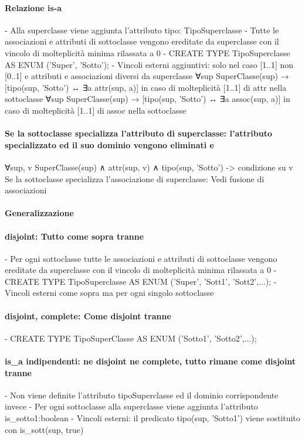 \documentclass[12pt]{article}
\begin{document}
\paragraph{Relazione is-a}
					- Alla superclasse viene aggiunta l'attributo tipo: TipoSuperclasse
					- Tutte le associazioni e attributi di sottoclasse vengono ereditate da superclasse con il vincolo di molteplicità minima rilassata a 0
					- CREATE TYPE TipoSuperclasse AS ENUM ('Super', 'Sotto');
					- Vincoli esterni aggiuntivi: solo nel caso [1..1] non [0..1] e attributi e associazioni diversi da superclasse
						∀sup SuperClasse(sup) → [tipo(sup, 'Sotto') ↔ ∃a attr(sup, a)] in caso di molteplicità [1..1] di attr nella sottoclasse
						∀sup SuperClasse(sup) → [tipo(sup, 'Sotto') ↔ ∃a assoc(sup, a)] in caso di molteplicità [1..1] di assoc nella sottoclasse
\paragraph{Se la sottoclasse specializza l'attributo di superclasse: l'attributo specializzato ed il suo dominio vengono eliminati e}
						∀sup, v SuperClasse(sup) ∧  attr(sup, v) ∧ tipo(sup, 'Sotto') -> condizione su v
						Se la sottoclasse specializza l'associazione di superclasse: Vedi fusione di associazioni 
						
\paragraph{Generalizzazione}
\paragraph{{disjoint}: Tutto come sopra tranne}
						- Per ogni sottoclasse tutte le associazioni e attributi di sottoclasse vengono ereditate da superclasse con il vincolo di molteplicità minima rilassata a 0
						- CREATE TYPE TipoSuperclasse AS ENUM ('Super', 'Sott1', 'Sott2',...);
						- Vincoli esterni come sopra ma per ogni singolo sottoclasse
\paragraph{{disjoint, complete}: Come {disjoint} tranne}
						- CREATE TYPE TipoSuperClasse AS ENUM ('Sotto1', 'Sotto2',...);
\paragraph{is_a indipendenti: ne disjoint ne complete, tutto rimane come {disjoint} tranne}
					- Non viene definite l'attributo tipoSuperclasse ed il dominio corrispondente invece
					- Per ogni sottoclasse alla superclasse viene aggiunta l'attributo is_sotto1:boolean 
					- Vincoli esterni: il predicato tipo(sup, 'Sotto1') viene sostituito con is_sott(sup, true)
\end{document}
